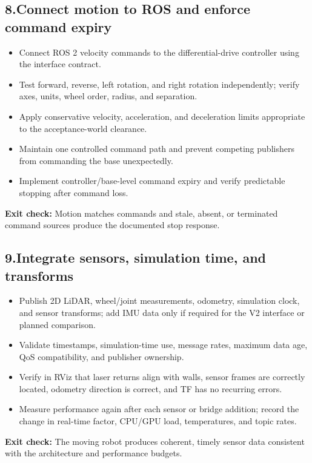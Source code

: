 \documentclass[10pt,a4paper]{article}
\newcommand{\cb}{\(\square\)}
\newcommand{\exitcheck}[1]{\vspace{2pt}\colorbox{PaleTeal}{\parbox{0.965\linewidth}{\textbf{Exit check:} #1}}}
\newcommand{\workstep}[2]{\subsection{\texorpdfstring{#1\quad #2}{#1\ #2}}}
\begin{document}
\workstep{8.}{Connect motion to ROS and enforce command expiry}
\begin{itemize}
  \item[\cb] Connect ROS 2 velocity commands to the differential-drive controller using the interface contract.
  \item[\cb] Test forward, reverse, left rotation, and right rotation independently; verify axes, units, wheel order, radius, and separation.
  \item[\cb] Apply conservative velocity, acceleration, and deceleration limits appropriate to the acceptance-world clearance.
  \item[\cb] Maintain one controlled command path and prevent competing publishers from commanding the base unexpectedly.
  \item[\cb] Implement controller/base-level command expiry and verify predictable stopping after command loss.
\end{itemize}
\exitcheck{Motion matches commands and stale, absent, or terminated command sources produce the documented stop response.}

\workstep{9.}{Integrate sensors, simulation time, and transforms}
\begin{itemize}
  \item[\cb] Publish 2D LiDAR, wheel/joint measurements, odometry, simulation clock, and sensor transforms; add IMU data only if required for the V2 interface or planned comparison.
  \item[\cb] Validate timestamps, simulation-time use, message rates, maximum data age, QoS compatibility, and publisher ownership.
  \item[\cb] Verify in RViz that laser returns align with walls, sensor frames are correctly located, odometry direction is correct, and TF has no recurring errors.
  \item[\cb] Measure performance again after each sensor or bridge addition; record the change in real-time factor, CPU/GPU load, temperatures, and topic rates.
\end{itemize}
\exitcheck{The moving robot produces coherent, timely sensor data consistent with the architecture and performance budgets.}
\end{document}
